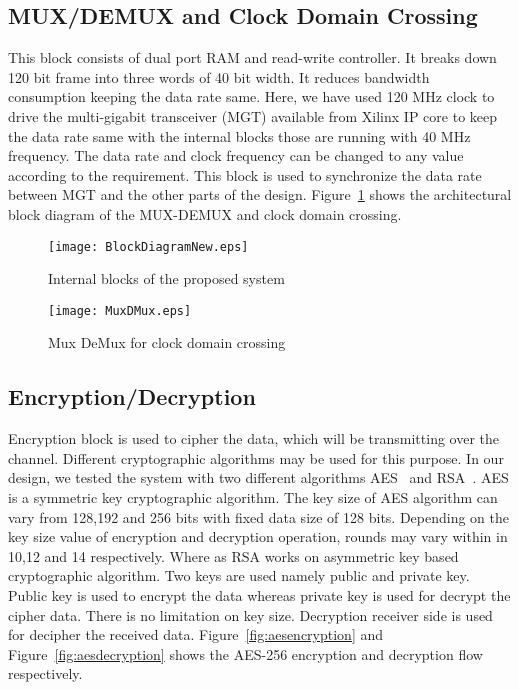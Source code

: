 \documentclass[a4paper]{jpconf}
\begin{document}
\subsection{MUX/DEMUX and Clock Domain Crossing} 
This block consists of dual port RAM and read-write controller. It breaks down 120 bit frame into three words of 40 bit width. It reduces bandwidth consumption keeping the data rate same. Here, we have used 120 MHz clock to drive the multi-gigabit transceiver (MGT) available from Xilinx IP core to keep the data rate same with the internal blocks those are running with 40 MHz frequency. The data rate and clock frequency can be changed to any value according to the requirement. This block is used to synchronize the data rate between MGT and the other parts of the design. Figure~\ref{fig:MuxDMux} shows the architectural block diagram of the MUX-DEMUX and clock domain crossing.

\begin{figure}[h]
\begin{minipage}{14pc}\texttt{[image: BlockDiagramNew.eps]}
\caption{\label{fig:BlockDiagramFlow}Internal blocks of the proposed system}
\end{minipage}\hspace{10pc}\begin{minipage}{14pc}

\texttt{[image: MuxDMux.eps]}
\caption{\label{fig:MuxDMux}Mux DeMux for clock domain crossing}
\end{minipage} 
\end{figure}
\vspace{-1 pc}
\subsection{Encryption/Decryption} \label{security}
Encryption block is used to cipher the data, which will be transmitting over the channel. Different cryptographic algorithms may be used for this purpose. In our design, we tested the system with two different algorithms AES~\cite{aes:nist} and RSA~\cite{RSA:algo}. AES is a symmetric key cryptographic algorithm. The key size of AES algorithm can vary from 128,192 and 256 bits with fixed data size of 128 bits. Depending on the key size value of encryption and decryption operation, rounds may vary within in 10,12 and 14 respectively. Where as RSA works on asymmetric key based cryptographic algorithm. Two keys are used namely public and private key. Public key is used to encrypt the data whereas private key is used for decrypt the cipher data. There is no limitation on key size. Decryption receiver side is used for decipher the received data. Figure~\ref{fig:aesencryption} and Figure~\ref{fig:aesdecryption} shows the AES-256 encryption and decryption flow respectively.
\end{document}
